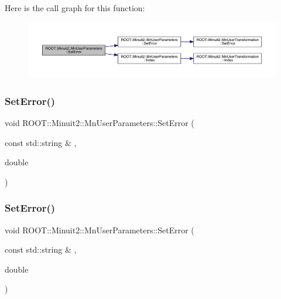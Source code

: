 Here is the call graph for this function\+:
\nopagebreak
\begin{figure}[H]
\begin{center}
\leavevmode
\includegraphics[width=350pt]{d6/d10/classROOT_1_1Minuit2_1_1MnUserParameters_aa3d8a9df23458438ccff06800d7c9af2_cgraph}
\end{center}
\end{figure}
\mbox{\label{classROOT_1_1Minuit2_1_1MnUserParameters_aa3d8a9df23458438ccff06800d7c9af2}} 
\subsubsection{\texorpdfstring{SetError()}{SetError()}\hspace{0.1cm}{\footnotesize\ttfamily [5/6]}}
{\footnotesize\ttfamily void R\+O\+O\+T\+::\+Minuit2\+::\+Mn\+User\+Parameters\+::\+Set\+Error (\begin{DoxyParamCaption}\item[{const std\+::string \&}]{,  }\item[{double}]{ }\end{DoxyParamCaption})}

\mbox{\label{classROOT_1_1Minuit2_1_1MnUserParameters_aa3d8a9df23458438ccff06800d7c9af2}} 
\subsubsection{\texorpdfstring{SetError()}{SetError()}\hspace{0.1cm}{\footnotesize\ttfamily [6/6]}}
{\footnotesize\ttfamily void R\+O\+O\+T\+::\+Minuit2\+::\+Mn\+User\+Parameters\+::\+Set\+Error (\begin{DoxyParamCaption}\item[{const std\+::string \&}]{,  }\item[{double}]{ }\end{DoxyParamCaption})}

